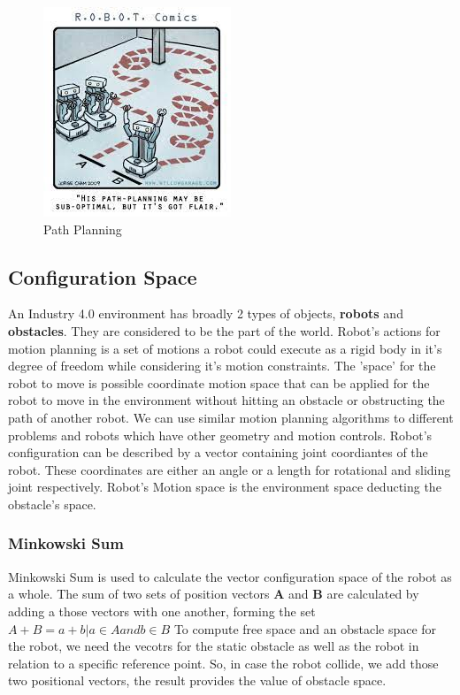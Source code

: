 \begin{figure}[th]
    \centering
    \includegraphics[width=0.5\textwidth]{Figures/path-planning-comic.jpeg}
    \decoRule
    \caption[]{Path Planning}
    \label{fig:Path Planning Comic}
\end{figure}


\subsection{Configuration Space}
An Industry 4.0 environment has broadly 2 types of objects, \textbf{robots} and \textbf{obstacles}. They are considered to be the part of the world.
Robot's actions for motion planning is a set of motions a robot could execute as a rigid body in it's degree of freedom while considering it's motion constraints. 
The 'space' for the robot to move is possible coordinate motion space that can be applied for the robot to move in the environment without hitting an obstacle or obstructing the path of another robot.
We can use similar motion planning algorithms to different problems and robots which have other geometry and motion controls. Robot's configuration can be described by a vector containing joint coordiantes of the robot. These coordinates are either an angle or a length for rotational and sliding joint respectively.
Robot's Motion space is the environment space deducting the obstacle's space. 

\subsubsection{Minkowski Sum}
Minkowski Sum is used to calculate the vector configuration space of the robot as a whole. The sum of two sets of position vectors \textbf{A} and \textbf{B} are calculated by adding a those vectors with one another, forming the set
$A + B = {a + b | a \in A and b \in B}$ 
To compute free space and an obstacle space for the robot, we need the vecotrs for the static obstacle as well as the robot in relation to a specific reference point. So, in case the robot collide, we add those two positional vectors, the result provides the value of obstacle space.

